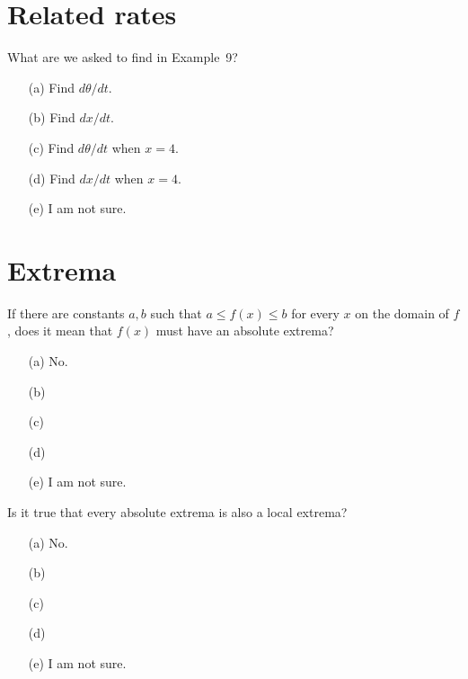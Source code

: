 \documentclass[14pt]{beamer}
\begin{document}
\section{Related rates}
\begin{frame}[t]
  What are we asked to find in Example~9?

  \medskip
  \begin{itemize} \setlength\itemsep{2ex}
    \item[(a)] Find \(d\theta/dt\).
    \item[(b)] Find \(dx/dt\).
    \item[(c)] Find \(d\theta/dt\) when \(x = 4\).
    \item[(d)] Find \(dx/dt\) when \(x = 4\).
    \item[(e)] I am not sure.
  \end{itemize} 
\end{frame}

\section{Extrema}

\begin{frame}[t]
  If there are constants \(a,b\) such that \(a \le f(x) \le b\) for every \(x\) on the domain of \(f\), does it mean that \(f(x)\) must have an absolute extrema?

  \medskip
  \begin{itemize} \setlength\itemsep{2ex}
    \item[(a)] No.
    \item[(b)]  
    \item[(c)] 
    \item[(d)] 
    \item[(e)] I am not sure.
  \end{itemize} 
\end{frame}


\begin{frame}[t]
  Is it true that every absolute extrema is also a local extrema?

  \medskip
  \begin{itemize} \setlength\itemsep{2ex}
    \item[(a)] No.
    \item[(b)]  
    \item[(c)] 
    \item[(d)] 
    \item[(e)] I am not sure.
  \end{itemize} 
\end{frame}
\end{document}
